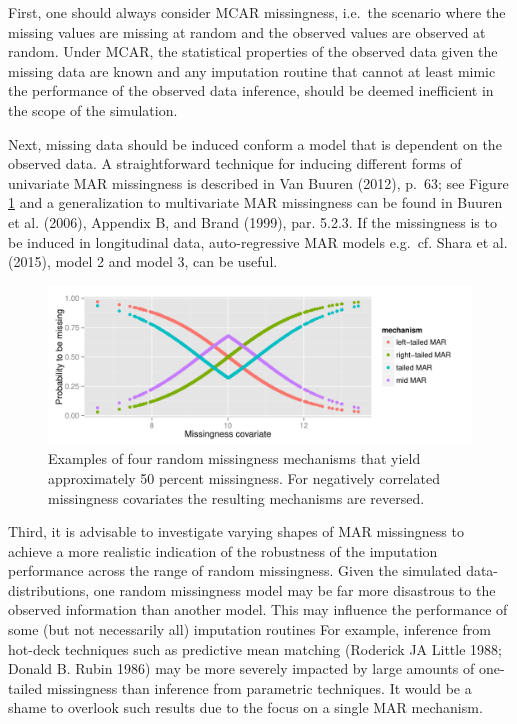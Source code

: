 \documentclass[
]{article}
\begin{document}
First, one should always consider MCAR missingness, i.e.~the scenario
where the missing values are missing at random and the observed values
are observed at random. Under MCAR, the statistical properties of the
observed data given the missing data are known and any imputation
routine that cannot at least mimic the performance of the observed data
inference, should be deemed inefficient in the scope of the simulation.

Next, missing data should be induced conform a model that is dependent
on the observed data. A straightforward technique for inducing different
forms of univariate MAR missingness is described in Van Buuren (2012),
p.~63; see Figure \ref{fig:MAR} and a generalization to multivariate MAR
missingness can be found in Buuren et al. (2006), Appendix B, and Brand
(1999), par. 5.2.3. If the missingness is to be induced in longitudinal
data, auto-regressive MAR models e.g.~cf. Shara et al. (2015), model 2
and model 3, can be useful.

\begin{figure}
\centering
\includegraphics{img/plot_mar.pdf}
\caption{\label{fig:MAR}Examples of four random missingness mechanisms
that yield approximately 50 percent missingness. For negatively
correlated missingness covariates the resulting mechanisms are
reversed.}
\end{figure}

Third, it is advisable to investigate varying shapes of MAR missingness
to achieve a more realistic indication of the robustness of the
imputation performance across the range of random missingness. Given the
simulated data-distributions, one random missingness model may be far
more disastrous to the observed information than another model. This may
influence the performance of some (but not necessarily all) imputation
routines For example, inference from hot-deck techniques such as
predictive mean matching (Roderick JA Little 1988; Donald B. Rubin 1986)
may be more severely impacted by large amounts of one-tailed missingness
than inference from parametric techniques. It would be a shame to
overlook such results due to the focus on a single MAR mechanism.
\end{document}
